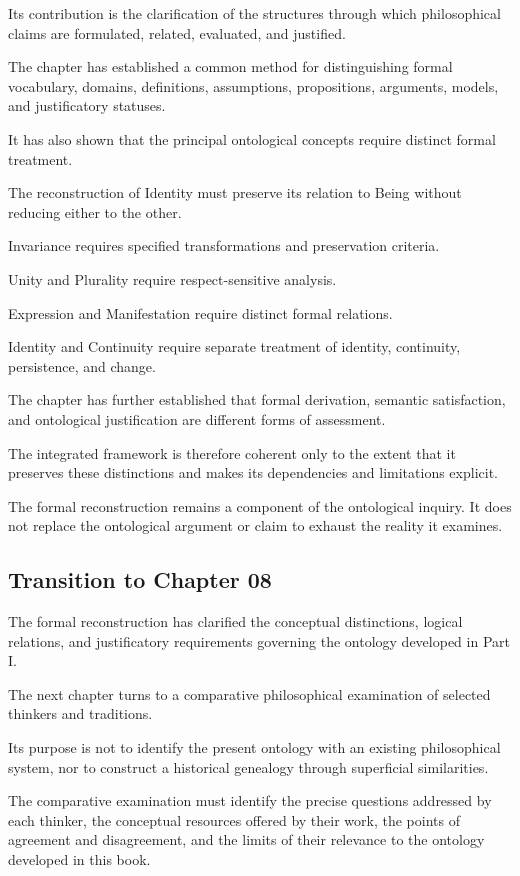 Its contribution
is the
clarification of
the structures
through which
philosophical claims
are formulated,
related, evaluated,
and justified.

The chapter
has established
a common
method for
distinguishing formal
vocabulary, domains,
definitions, assumptions,
propositions, arguments,
models, and
justificatory statuses.

It has also
shown that
the principal
ontological concepts
require distinct
formal treatment.

The reconstruction
of Identity
must preserve
its relation
to Being
without reducing
either to
the other.

Invariance requires
specified transformations
and preservation
criteria.

Unity and
Plurality require
respect-sensitive
analysis.

Expression and
Manifestation require
distinct formal
relations.

Identity and
Continuity require
separate treatment
of identity,
continuity, persistence,
and change.

The chapter
has further
established that
formal derivation,
semantic satisfaction,
and ontological
justification are
different forms
of assessment.

The integrated
framework is
therefore coherent
only to
the extent
that it
preserves these
distinctions and
makes its
dependencies and
limitations explicit.

The formal
reconstruction remains
a component
of the
ontological inquiry.
It does
not replace
the ontological
argument or
claim to
exhaust the
reality it
examines.

\subsection{Transition to Chapter 08}

The formal
reconstruction has
clarified the
conceptual distinctions,
logical relations,
and justificatory
requirements governing
the ontology
developed in
Part I.

The next
chapter turns
to a
comparative philosophical
examination of
selected thinkers
and traditions.

Its purpose
is not
to identify
the present
ontology with
an existing
philosophical system,
nor to
construct a
historical genealogy
through superficial
similarities.

The comparative
examination must
identify the
precise questions
addressed by
each thinker,
the conceptual
resources offered
by their work,
the points
of agreement
and disagreement,
and the
limits of
their relevance
to the
ontology developed
in this
book.

